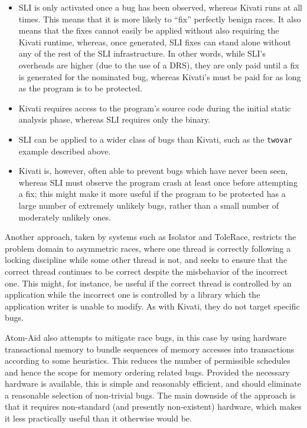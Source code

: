 \documentclass[10pt,twocolumn,preprint,natbib,authoryear]{sigplanconf}
\newcommand{\editorial}[1]{}
\begin{document}
\begin{itemize}
\item SLI is only activated once a bug has been observed, whereas
  Kivati runs at all times.  This means that it is more likely to
  ``fix'' perfectly benign races.  It also means that the fixes cannot
  easily be applied without also requiring the Kivati runtime,
  whereas, once generated, SLI fixes can stand alone without any of
  the rest of the SLI infrastructure.  In other words, while SLI's
  overheads are higher (due to the use of a DRS), they are only paid
  until a fix is generated for the nominated bug, whereas Kivati's
  must be paid for as long as the program is to be protected.
\item Kivati requires access to the program's source code during the
  initial static analysis phase, whereas SLI requires only the binary.
\item SLI can be applied to a wider class of bugs than Kivati, such as
  the \verb|twovar| example described above.
\item Kivati is, however, often able to prevent bugs which have never
  been seen, whereas SLI must observe the program crash at least once
  before attempting a fix; this might make it more useful if the
  program to be protected has a large number of extremely unlikely
  bugs, rather than a small number of moderately unlikely ones.
\end{itemize}

Another approach, taken by systems such as Isolator
\cite{Ramalingam2009} and ToleRace\cite{Ratanaworabhan2008}, restricts
the problem domain to asymmetric races, where one thread is correctly
following a locking discipline while some other thread is not, and
seeks to ensure that the correct thread continues to be correct
despite the misbehavior of the incorrect one.  This might, for
instance, be useful if the correct thread is controlled by an
application while the incorrect one is controlled by a library which
the application writer is unable to modify.  As with Kivati, they do
not target specific bugs.\editorial{...}

Atom-Aid\cite{Lucia2009} also attempts to mitigate race bugs, in
this case by using hardware transactional memory to
bundle sequences of memory accesses into
transactions according to some heuristics.  This reduces the
number of permissible schedules and hence the scope for memory
ordering related bugs.  Provided the necessary hardware is available,
this is simple and reasonably efficient, and should eliminate a
reasonable selection of non-trivial bugs.  The main downside of the
approach is that it requires non-standard (and presently non-existent)
hardware, which makes it less practically useful than it otherwise
would be.
\end{document}
